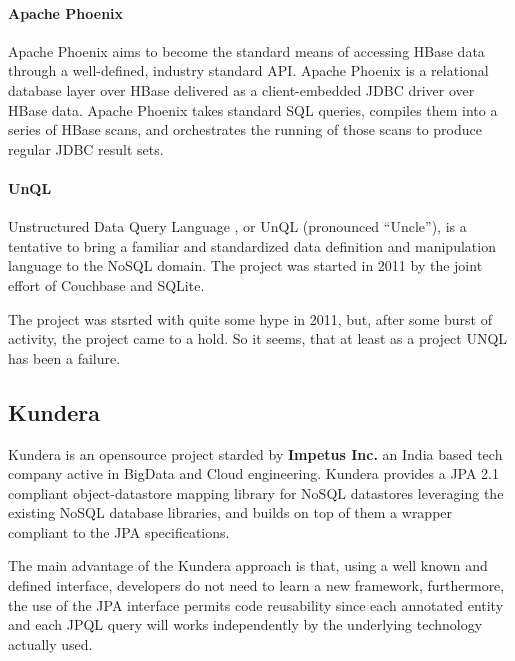 \paragraph{Apache Phoenix} Apache Phoenix \cite{online:apache-phoenix} aims to become the standard means of accessing HBase data through a well-defined, industry standard API.
Apache Phoenix is a relational database layer over HBase delivered as a client-embedded JDBC driver over HBase data. Apache Phoenix takes standard SQL queries, compiles them into a series of HBase scans, and orchestrates the running of those scans to produce regular JDBC result sets. 

\paragraph{UnQL}  
Unstructured Data Query Language \cite{online:unql}, or UnQL (pronounced “Uncle”), is a tentative to bring a familiar and standardized data definition and manipulation language to the NoSQL domain. The project was started in 2011 by the joint effort of Couchbase and SQLite.

\noindent The project was stsrted with quite some hype in 2011, but, after some burst of activity, the project came to a hold. So it seems, that at least as a project UNQL has been a failure. 

\subsection{Kundera}
Kundera is an opensource project starded by \textbf{Impetus Inc.} an India based tech company active in BigData and Cloud engineering.
Kundera provides a JPA 2.1 compliant object-datastore mapping library for NoSQL datastores leveraging the existing NoSQL database libraries, and builds on top of them a wrapper compliant to the JPA specifications.

\newparagraph The main advantage of the Kundera approach is that, using a well known and defined interface, developers do not need to learn a new framework, furthermore, the use of the JPA interface permits code reusability since each annotated entity and each JPQL query will works independently by the underlying technology actually used.

